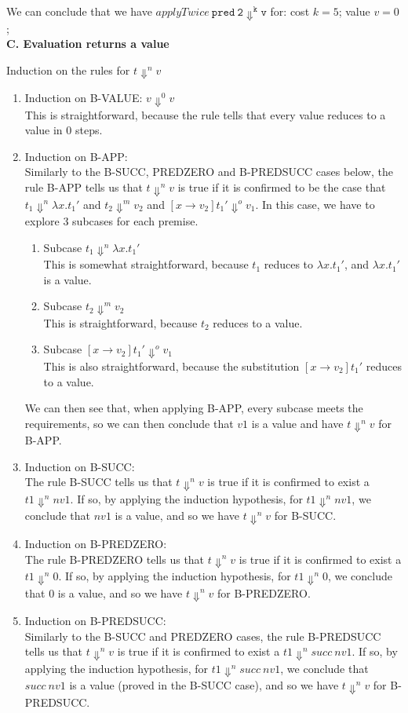 \documentclass[a4paper]{article}
\begin{document}
We can conclude that we have $applyTwice \ \mathtt{pred \ 2 \Downarrow^k v}$ for: cost $k = 5$; value $v = 0$;\\

\textbf{C. Evaluation returns a value}

Induction on the rules for $t \Downarrow^n v$

\begin{enumerate}
\item Induction on B-VALUE: $v \Downarrow^0 v$
\\This is straightforward, because the rule tells that every value reduces to a value in 0 steps.
\item Induction on B-APP:
\\Similarly to the B-SUCC, PREDZERO and B-PREDSUCC cases below, the rule B-APP tells us that $t \Downarrow^n v$ is true if it is confirmed to be the case that $t_1 \Downarrow^n \lambda x.t_1'$ and $t_2 \Downarrow^m v_2$ and $[x \rightarrow v_2]t_1' \Downarrow^o v_1$. In this case, we have to explore 3 subcases for each premise.
	\begin{enumerate}
	\item Subcase $t_1 \Downarrow^n \lambda x.t_1'$
	\\This is somewhat straightforward, because $t_1$ reduces to $\lambda x.t_1'$, and $\lambda x.t_1'$ is a value.
	\item Subcase $t_2 \Downarrow^m v_2$
	\\This is straightforward, because $t_2$ reduces to a value.
	\item Subcase $[x \rightarrow v_2]t_1' \Downarrow^o v_1$
	\\This is also straightforward, because the substitution $[x \rightarrow v_2]t_1'$ reduces to a value.
	\end{enumerate}
We can then see that, when applying B-APP, every subcase meets the requirements, so we can then conclude that $v1$ is a value and have $t \Downarrow^n v$ for B-APP.
\item Induction on B-SUCC:
\\The rule B-SUCC tells us that $t \Downarrow^n v$ is true if it is confirmed to exist a $t1 \Downarrow^n nv1$. If so, by applying the induction hypothesis, for $t1 \Downarrow^n nv1$, we conclude that $nv1$ is a value, and so we have $t \Downarrow^n v$ for B-SUCC.
\item Induction on B-PREDZERO:
\\The rule B-PREDZERO tells us that $t \Downarrow^n v$ is true if it is confirmed to exist a $t1 \Downarrow^n 0$. If so, by applying the induction hypothesis, for $t1 \Downarrow^n 0$, we conclude that $0$ is a value, and so we have $t \Downarrow^n v$ for B-PREDZERO.
\item Induction on B-PREDSUCC:
\\Similarly to the B-SUCC and PREDZERO cases, the rule B-PREDSUCC tells us that $t \Downarrow^n v$ is true if it is confirmed to exist a $t1 \Downarrow^n succ \ nv1$. If so, by applying the induction hypothesis, for $t1 \Downarrow^n succ \ nv1$, we conclude that $succ \ nv1$ is a value (proved in the B-SUCC case), and so we have $t \Downarrow^n v$ for B-PREDSUCC.
\end{enumerate}
\end{document}

